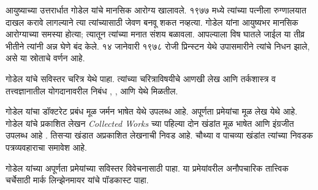 \documentclass[../../../include/open-logic-section]{subfiles}
\begin{document}
आयुष्याच्या उत्तरार्धात गोडेल यांचे मानसिक आरोग्य खालावले. १९७७ मध्ये त्यांच्या पत्नीला रुग्णालयात दाखल करावे लागल्याने त्या त्यांच्यासाठी जेवण बनवू शकत नव्हत्या. गोडेल यांना आयुष्यभर मानसिक आरोग्याच्या समस्या होत्या; त्यातून त्यांच्या मनात संशय बळावला. आपल्याला विष घातले जाईल या तीव्र भीतीने त्यांनी अन्न घेणे बंद केले. १४ जानेवारी १९७८ रोजी प्रिन्स्टन येथे उपासमारीने त्यांचे निधन झाले, असे या स्रोताचे वर्णन आहे.

\begin{reading}
गोडेल यांचे सविस्तर चरित्र \citet{Dawson1997} येथे पाहा. त्यांच्या चरित्राविषयीचे आणखी लेख आणि तर्कशास्त्र व तत्त्वज्ञानातील योगदानावरील निबंध \citet{Wang1990}, \citet{Baaz2011}, \citet{Takeuti2003} आणि \citet{Sigmund2007} येथे मिळतील.

गोडेल यांचा डॉक्टरेट प्रबंध मूळ जर्मन भाषेत \citep{Godel1929} येथे उपलब्ध आहे. अपूर्णता प्रमेयांचा मूळ लेख \citep{Godel1931} येथे आहे. गोडेल यांचे प्रकाशित लेखन \emph{Collected Works} च्या पहिल्या दोन खंडांत मूळ भाषेत आणि इंग्रजीत उपलब्ध आहे \citep{Godel1986,Godel1990}. तिसऱ्या खंडात अप्रकाशित लेखनाची निवड आहे. चौथ्या व पाचव्या खंडांत त्यांच्या निवडक पत्रव्यवहाराचा समावेश आहे.

गोडेल यांच्या अपूर्णता प्रमेयांच्या सविस्तर विवेचनासाठी \citet{Smith2013} पाहा. या प्रमेयांवरील अनौपचारिक तात्त्विक चर्चेसाठी मार्क लिन्झेनमायर यांचे पॉडकास्ट \citep{Linsenmayer2014} पाहा.
\end{reading}
\end{document}
